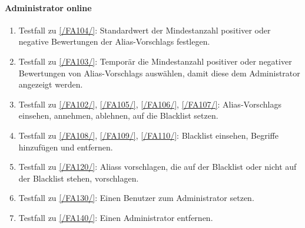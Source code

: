 \paragraph{\Gls{Administrator} online}
\begin{enumerate}[label=\textbf{/T\arabic*0/}, align=left, resume]
	\item \label{/T260/} Testfall zu \ref{/FA104/}: Standardwert der Mindestanzahl positiver oder negative Bewertungen der \Glspl{Alias-Vorschlag} festlegen.
	\item \label{/T270/} Testfall zu \ref{/FA103/}: Temporär die Mindestanzahl positiver oder negativer Bewertungen von \Glspl{Alias-Vorschlag} auswählen, damit diese dem \Gls{Administrator} angezeigt werden.
	\item \label{/T280/} Testfall zu \ref{/FA102/}, \ref{/FA105/}, \ref{/FA106/}, \ref{/FA107/}: \Glspl{Alias-Vorschlag} einsehen, annehmen, ablehnen, auf die \Gls{Blacklist} setzen.
	\item \label{/T290/} Testfall zu \ref{/FA108/}, \ref{/FA109/}, \ref{/FA110/}: \Gls{Blacklist} einsehen, Begriffe hinzufügen und entfernen.
	\item \label{/T300/} Testfall zu \ref{/FA120/}: \Glspl{Alias} vorschlagen, die auf der \Gls{Blacklist} oder nicht auf der \Gls{Blacklist} stehen, vorschlagen.
	\item \label{/T310/} Testfall zu \ref{/FA130/}: Einen \Gls{Benutzer} zum \Gls{Administrator} setzen.
	\item \label{/T320/} Testfall zu \ref{/FA140/}: Einen \Gls{Administrator} entfernen.
\end{enumerate}
